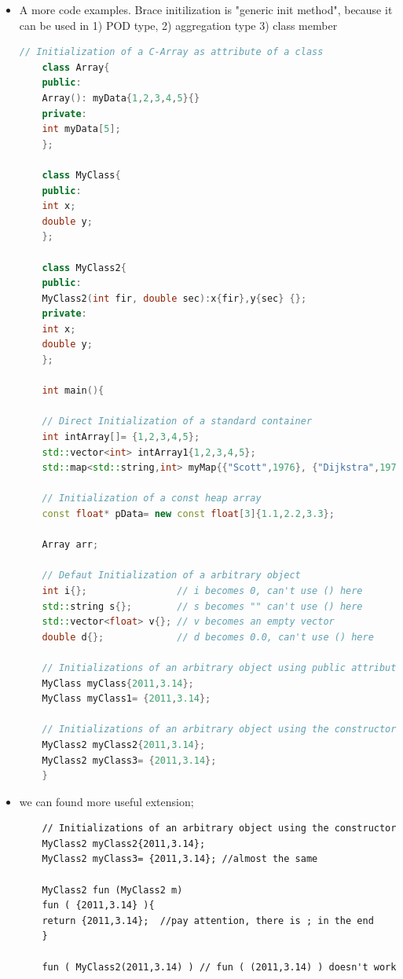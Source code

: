 \documentclass[a4paper,12pt,twoside]{book}
\begin{document}
\begin{itemize}
	
	\item A more code examples. Brace initilization is "generic init method", because it can be used in 1) POD type, 2) aggregation type 3) class member
	\begin{lstlisting}[frame=single, language=c++,mathescape=true]
	// Initialization of a C-Array as attribute of a class
	class Array{
	public:
	Array(): myData{1,2,3,4,5}{}    
	private:
	int myData[5];
	};
	
	class MyClass{			
	public: 
	int x;
	double y;
	};
	
	class MyClass2{		
	public:
	MyClass2(int fir, double sec):x{fir},y{sec} {};
	private: 
	int x;
	double y;
	};
	
	int main(){
	
	// Direct Initialization of a standard container
	int intArray[]= {1,2,3,4,5};   
	std::vector<int> intArray1{1,2,3,4,5};  
	std::map<std::string,int> myMap{{"Scott",1976}, {"Dijkstra",1972}};
	
	// Initialization of a const heap array
	const float* pData= new const float[3]{1.1,2.2,3.3};
	
	Array arr;
	
	// Defaut Initialization of a arbitrary object   
	int i{};                // i becomes 0, can't use () here
	std::string s{};        // s becomes "" can't use () here
	std::vector<float> v{}; // v becomes an empty vector
	double d{};             // d becomes 0.0, can't use () here
	
	// Initializations of an arbitrary object using public attributes	
	MyClass myClass{2011,3.14};      
	MyClass myClass1= {2011,3.14};    
	
	// Initializations of an arbitrary object using the constructor
	MyClass2 myClass2{2011,3.14};     
	MyClass2 myClass3= {2011,3.14};   
	}
	\end{lstlisting}
	
	\item we can found more useful extension;
	
	
	\begin{lstlisting}
	// Initializations of an arbitrary object using the constructor
	MyClass2 myClass2{2011,3.14};     
	MyClass2 myClass3= {2011,3.14}; //almost the same
	
	MyClass2 fun (MyClass2 m) 
	fun ( {2011,3.14} ){
	return {2011,3.14};  //pay attention, there is ; in the end
	}
	
	fun ( MyClass2(2011,3.14) ) // fun ( (2011,3.14) ) doesn't work
	\end{lstlisting}
	

\end{itemize}
\end{document}
